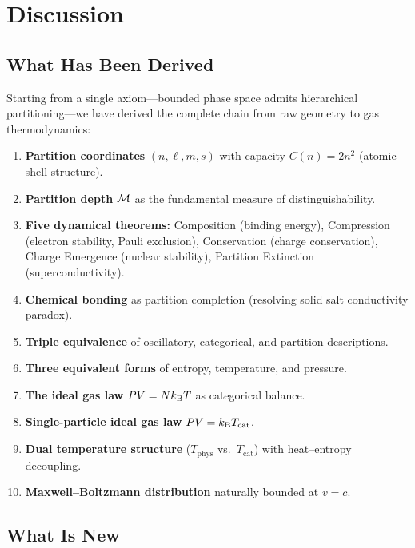 \section{Discussion}
\label{sec:discussion}

\subsection{What Has Been Derived}

Starting from a single axiom---bounded phase space admits hierarchical partitioning---we have derived the complete chain from raw geometry to gas thermodynamics:

\begin{enumerate}
    \item \textbf{Partition coordinates} $(n, \ell, m, s)$ with capacity $C(n) = 2n^2$ (atomic shell structure).
    \item \textbf{Partition depth} $\mathcal{M}$ as the fundamental measure of distinguishability.
    \item \textbf{Five dynamical theorems:} Composition (binding energy), Compression (electron stability, Pauli exclusion), Conservation (charge conservation), Charge Emergence (nuclear stability), Partition Extinction (superconductivity).
    \item \textbf{Chemical bonding} as partition completion (resolving solid salt conductivity paradox).
    \item \textbf{Triple equivalence} of oscillatory, categorical, and partition descriptions.
    \item \textbf{Three equivalent forms} of entropy, temperature, and pressure.
    \item \textbf{The ideal gas law} $PV = Nk_{\mathrm{B}} T$ as categorical balance.
    \item \textbf{Single-particle ideal gas law} $PV = k_{\mathrm{B}} T_{\mathrm{cat}}$.
    \item \textbf{Dual temperature structure} ($T_{\mathrm{phys}}$ vs.\ $T_{\mathrm{cat}}$) with heat--entropy decoupling.
    \item \textbf{Maxwell--Boltzmann distribution} naturally bounded at $v = c$.
\end{enumerate}

\subsection{What Is New}

